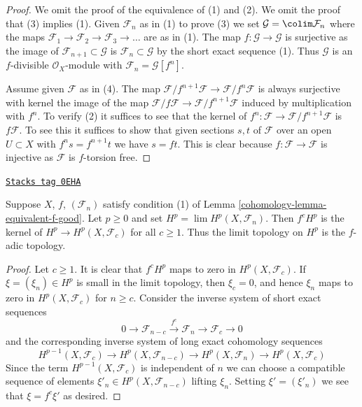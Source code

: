 \begin{proof}
We omit the proof of the equivalence of (1) and (2). We omit the proof
that (3) implies (1). Given $\mathcal{F}_n$ as in (1) to prove (3) we set
$\mathcal{G} = \colim \mathcal{F}_n$ where the maps
$\mathcal{F}_1 \to \mathcal{F}_2 \to \mathcal{F}_3 \to \ldots$
are as in (1). The map $f : \mathcal{G} \to \mathcal{G}$
is surjective as the image of $\mathcal{F}_{n + 1} \subset \mathcal{G}$
is $\mathcal{F}_n \subset \mathcal{G}$ by the short exact sequence (1).
Thus $\mathcal{G}$ is an $f$-divisible $\mathcal{O}_X$-module
with $\mathcal{F}_n = \mathcal{G}[f^n]$.

\medskip\noindent
Assume given $\mathcal{F}$ as in (4). The map
$\mathcal{F}/f^{n + 1}\mathcal{F} \to \mathcal{F}/f^n\mathcal{F}$
is always surjective with kernel the image of the map
$\mathcal{F}/f\mathcal{F} \to \mathcal{F}/f^{n + 1}\mathcal{F}$
induced by multiplication with $f^n$. To verify (2)
it suffices to see that the kernel of
$f^n : \mathcal{F} \to \mathcal{F}/f^{n + 1}\mathcal{F}$
is $f\mathcal{F}$. To see this it suffices to show that given
sections $s, t$ of $\mathcal{F}$ over an open $U \subset X$
with $f^ns = f^{n + 1}t$ we have $s = ft$. This is clear because
$f : \mathcal{F} \to \mathcal{F}$ is injective as $\mathcal{F}$
is $f$-torsion free.
\end{proof}

\begin{lemma}
\label{cohomology-lemma-topology-I-adic-f}
\href{https://stacks.math.columbia.edu/tag/0EHA}{\texttt{Stacks tag 0EHA}}

Suppose $X$, $f$, $(\mathcal{F}_n)$ satisfy condition (1) of
Lemma \ref{cohomology-lemma-equivalent-f-good}. Let $p \geq 0$ and set
$H^p = \lim H^p(X, \mathcal{F}_n)$.
Then $f^cH^p$ is the kernel of $H^p \to H^p(X, \mathcal{F}_c)$ for all
$c \geq 1$. Thus the limit topology on $H^p$ is the $f$-adic topology.
\end{lemma}

\begin{proof}
Let $c \geq 1$. It is clear that $f^c H^p$ maps to zero in
$H^p(X, \mathcal{F}_c)$. If $\xi = (\xi_n) \in H^p$ is small in the
limit topology, then $\xi_c = 0$, and hence $\xi_n$
maps to zero in $H^p(X, \mathcal{F}_c)$ for $n \geq c$.
Consider the inverse system of short exact sequences
$$
0 \to \mathcal{F}_{n - c} \xrightarrow{f^c} \mathcal{F}_n \to
\mathcal{F}_c \to 0
$$
and the corresponding inverse system of long exact cohomology sequences
$$
H^{p - 1}(X, \mathcal{F}_c) \to
H^p(X, \mathcal{F}_{n - c}) \to
H^p(X, \mathcal{F}_n) \to
H^p(X, \mathcal{F}_c)
$$
Since the term $H^{p - 1}(X, \mathcal{F}_c)$ is independent of
$n$ we can choose a compatible sequence of elements
$\xi'_n \in H^p(X, \mathcal{F}_{n - c})$
lifting $\xi_n$. Setting $\xi' = (\xi'_n)$ we see that $\xi = f^c \xi'$
as desired.
\end{proof}

